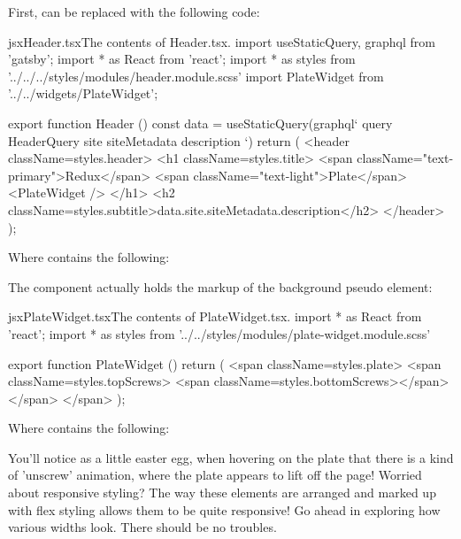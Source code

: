 \documentclass[a4paper,headinclude=on,footinclude=on,12pt,oneside]{scrbook}
\begin{document}
First,  can be replaced with the following code:

\begin{codeInput}{jsx}{Header.tsx}{The contents of Header.tsx.}
import { useStaticQuery, graphql } from 'gatsby';
import * as React from 'react';
import * as styles from '../../../styles/modules/header.module.scss'
import { PlateWidget } from '../../widgets/PlateWidget';

export function Header () {
  const data = useStaticQuery(graphql`
    query HeaderQuery {
      site {
        siteMetadata {
          description
        }
      }
    }
  `)
  return (
    <header className={styles.header}>
    <h1 className={styles.title}>
      <span className="text-primary">Redux</span>
      <span className="text-light">Plate</span>
      <PlateWidget />
    </h1>
    <h2 className={styles.subtitle}>{data.site.siteMetadata.description}</h2>
  </header>
  );
}  
\end{codeInput}

Where  contains the following:


The  component actually holds the markup of the background pseudo element:

\begin{codeInput}{jsx}{PlateWidget.tsx}{The contents of PlateWidget.tsx.}
import * as React from 'react';
import * as styles from '../../styles/modules/plate-widget.module.scss'

export function PlateWidget () {
  return (
    <span className={styles.plate}>
      <span className={styles.topScrews}>
        <span className={styles.bottomScrews}></span>
      </span>
    </span>
  );
}  
\end{codeInput}

Where  contains the following:


You'll notice as a little easter egg, when hovering on the plate that there is a kind of 'unscrew' animation, where the plate appears to lift off the page! Worried about responsive styling? The way these elements are arranged and marked up with flex styling allows them to be quite responsive! Go ahead in exploring how various widths look. There should be no troubles.
\end{document}
